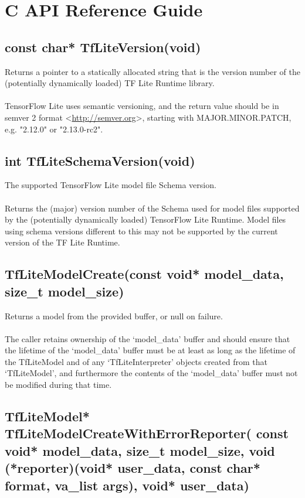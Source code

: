 \documentclass{ol-softwaremanual}
\begin{document}
\section{C API Reference Guide}

\subsection{const char* TfLiteVersion(void)}
Returns a pointer to a statically allocated string that is the version number of the (potentially dynamically loaded) TF Lite Runtime library.\\\\
TensorFlow Lite uses semantic versioning, and the return value should be in semver 2 format <\url{http://semver.org}>, starting with MAJOR.MINOR.PATCH, e.g. "2.12.0" or "2.13.0-rc2".

\subsection{int TfLiteSchemaVersion(void)}
The supported TensorFlow Lite model file Schema version.\\\\
Returns the (major) version number of the Schema used for model files supported by the (potentially dynamically loaded) TensorFlow Lite Runtime.
Model files using schema versions different to this may not be supported by the current version of the TF Lite Runtime.

\subsection{TfLiteModelCreate(const void* model\_data, size\_t model\_size)}

Returns a model from the provided buffer, or null on failure.\\\\
The caller retains ownership of the `model\_data' buffer and should ensure that the lifetime of the `model\_data' buffer must be at least as long as the lifetime of the TfLiteModel and of any `TfLiteInterpreter' objects created from that `TfLiteModel', and furthermore the contents of the `model\_data' buffer must not be modified during that time.

\subsection{TfLiteModel* TfLiteModelCreateWithErrorReporter(
    const void* model\_data, size\_t model\_size,
    void (*reporter)(void* user\_data, const char* format, va\_list args),
    void* user\_data)}
\end{document}
